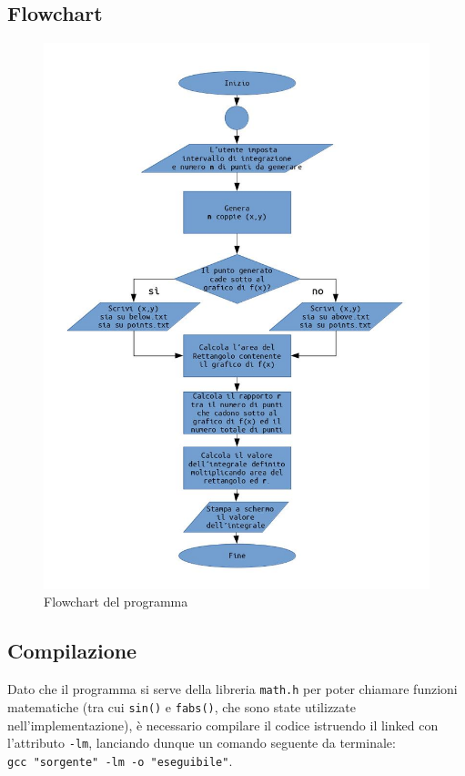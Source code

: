 \documentclass[a4paper, 12pt, oneside]{article}
\begin{document}
		\subsection{Flowchart}
			\begin{figure}[!htb]
			\begin{minipage}{\textwidth}
				\centering
				\includegraphics[width=1\linewidth]{flowchart.jpg}
				\caption{Flowchart del programma}
				\label{flowchart}
			\end{minipage}
		\end{figure}
		
		\subsection{Compilazione}
		Dato che il programma si serve della libreria \texttt{math.h} per poter chiamare funzioni matematiche (tra cui \texttt{sin()} e \texttt{fabs()}, che sono state utilizzate nell'implementazione), è necessario compilare il codice istruendo il linked con l'attributo \texttt{-lm}, lanciando dunque un comando seguente da terminale:\\\texttt{gcc "sorgente" -lm -o "eseguibile"}.
	
\end{document}
